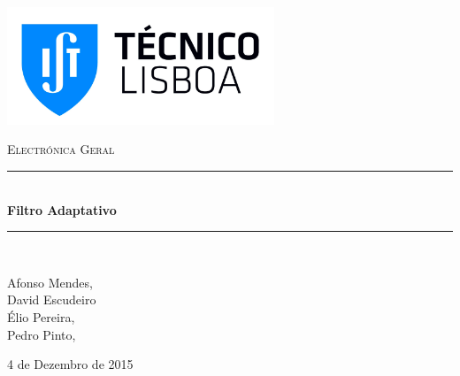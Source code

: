 \documentclass[a4paper,11pt]{report}
\newcommand{\HRule}{\rule{\linewidth}{0.5mm}}
\begin{document}
	
 
\begin{titlepage}

	\begin{flushleft}
	\includegraphics[width=0.6\textwidth]{./logo}~\\[4cm]
	\end{flushleft}

\begin{center}
\begin{spacing}{2}

	\textsc{\LARGE Electrónica Geral}\\[1cm]

\HRule \\[0.4cm]
{ \huge \bfseries Filtro Adaptativo}\\[0.4cm]

\HRule \\[1.5cm]

\end{spacing}

	\vspace{2cm}

	Afonso Mendes, \\
	David Escudeiro \\
	Élio Pereira, \\
	Pedro Pinto, \\
	\vspace{4cm}


\vfill

{\large 4 de Dezembro de 2015}
\end{center}
\end{titlepage} 





\tableofcontents %
\setcounter{page}{1} %
\end{document}
